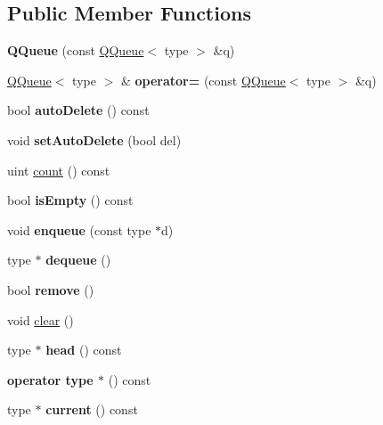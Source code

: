 \subsection*{Public Member Functions}
\begin{DoxyCompactItemize}
\item 
\mbox{\label{class_q_queue_aab79e1e35254c162e46d07c41f7e1385}} 
{\bfseries Q\+Queue} (const \mbox{\hyperlink{class_q_queue}{Q\+Queue}}$<$ type $>$ \&q)
\item 
\mbox{\label{class_q_queue_ab99ae42c4827b7b95028794a94c0cbb4}} 
\mbox{\hyperlink{class_q_queue}{Q\+Queue}}$<$ type $>$ \& {\bfseries operator=} (const \mbox{\hyperlink{class_q_queue}{Q\+Queue}}$<$ type $>$ \&q)
\item 
\mbox{\label{class_q_queue_a90e1f5aa90f602586e6bd3159ea4bc45}} 
bool {\bfseries auto\+Delete} () const
\item 
\mbox{\label{class_q_queue_aa376db4c36968c2718aaf0e4d380515a}} 
void {\bfseries set\+Auto\+Delete} (bool del)
\item 
uint \mbox{\hyperlink{class_q_queue_aa01eca1beb057eb3055272a528e4ee01}{count}} () const
\item 
\mbox{\label{class_q_queue_a0bf2142fc038af86f2bde60e40faa98c}} 
bool {\bfseries is\+Empty} () const
\item 
\mbox{\label{class_q_queue_a23eabd2eb37ec3e2c82f6303e030f24f}} 
void {\bfseries enqueue} (const type $\ast$d)
\item 
\mbox{\label{class_q_queue_aed04c9f7a9e7f0b9657e41c8e7cadaf4}} 
type $\ast$ {\bfseries dequeue} ()
\item 
\mbox{\label{class_q_queue_aff4e8f7ace255c44b706f056c01e7845}} 
bool {\bfseries remove} ()
\item 
void \mbox{\hyperlink{class_q_queue_a39841ee54f380f58fb96be30eb5e7c89}{clear}} ()
\item 
\mbox{\label{class_q_queue_a0101b4f342cbc0451ea0a47fa0fec470}} 
type $\ast$ {\bfseries head} () const
\item 
\mbox{\label{class_q_queue_a0c40eecbcb312964075e604f5050a5d0}} 
{\bfseries operator type $\ast$} () const
\item 
\mbox{\label{class_q_queue_a2cb7cbfed550317d4937cea728bbe2a9}} 
type $\ast$ {\bfseries current} () const
\end{DoxyCompactItemize}


